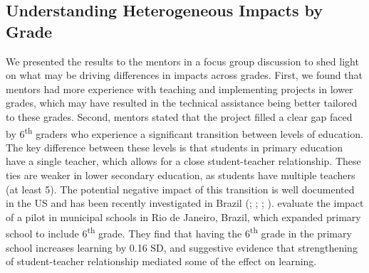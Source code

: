 \documentclass[11pt,a4paper]{article}
\begin{document}
	\subsection{Understanding Heterogeneous Impacts by Grade}
	
	We presented the results to the mentors in a focus group discussion to shed light on what may be driving differences in impacts across grades. First, we found that mentors had more experience with teaching and implementing projects in lower grades, which may have resulted in the technical assistance being better tailored to these grades. Second, mentors stated that the project filled a clear gap faced by 6\textsuperscript{th} graders who experience a significant transition between levels of education. The key difference between these levels is that students in primary education have a single teacher, which allows for a close student-teacher relationship. These ties are weaker in lower secondary education, as students have multiple teachers (at least 5). The potential negative impact of this transition is well documented in the US and has been recently investigated in Brazil (\citealp{bedard2005middle}; \citealp{cook2006should}; \citealp{hanewald2013transition}; \citealp{Santos2017}). \cite{Santos2017} evaluate the impact of a pilot in municipal schools in Rio de Janeiro, Brazil, which expanded primary school to include  6\textsuperscript{th} grade. They find that having the 6\textsuperscript{th} grade in the primary school increases learning by 0.16 SD, and suggestive evidence that strengthening of student-teacher relationship mediated some of the effect on learning.  
	
\end{document}
